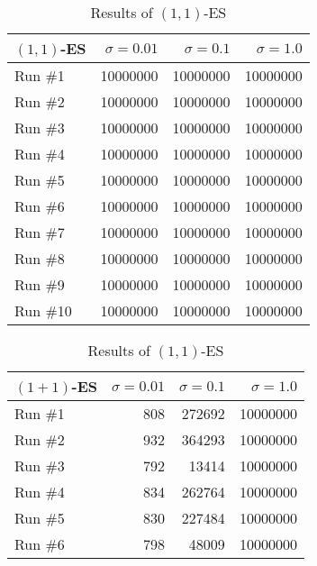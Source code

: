 \documentclass[12pt,letterpaper]{article}
\begin{document}
\begin{table}[H]
    \parbox{.5\linewidth}{
        \centering
        \begin{tabular}{l|r|r|r}
            $(1, 1)$-ES & $\sigma = 0.01$ & $\sigma = 0.1$ & $\sigma = 1.0$ \\ \hline
            Run \#1      & 10000000       & 10000000       & 10000000       \\ \hline
            Run \#2      & 10000000       & 10000000       & 10000000       \\ \hline
            Run \#3      & 10000000       & 10000000       & 10000000       \\ \hline
            Run \#4      & 10000000       & 10000000       & 10000000       \\ \hline
            Run \#5      & 10000000       & 10000000       & 10000000       \\ \hline
            Run \#6      & 10000000       & 10000000       & 10000000       \\ \hline
            Run \#7      & 10000000       & 10000000       & 10000000       \\ \hline
            Run \#8      & 10000000       & 10000000       & 10000000       \\ \hline
            Run \#9      & 10000000       & 10000000       & 10000000       \\ \hline
            Run \#10     & 10000000       & 10000000       & 10000000       \\
        \end{tabular}
        \caption{Results of $(1, 1)$-ES}
        \label{tab:3a}
    }
    \hfill
    \parbox{.5\linewidth}{
        \centering
        \begin{tabular}{l|r|r|r}
            $(1 + 1)$-ES & $\sigma = 0.01$ & $\sigma = 0.1$ & $\sigma = 1.0$ \\ \hline
            Run \#1      & 808             & 272692         & 10000000       \\ \hline
            Run \#2      & 932             & 364293         & 10000000       \\ \hline
            Run \#3      & 792             & 13414          & 10000000       \\ \hline
            Run \#4      & 834             & 262764         & 10000000       \\ \hline
            Run \#5      & 830             & 227484         & 10000000       \\ \hline
            Run \#6      & 798             & 48009          & 10000000       \\ \hline

\end{tabular}}
\end{table}
\end{document}

